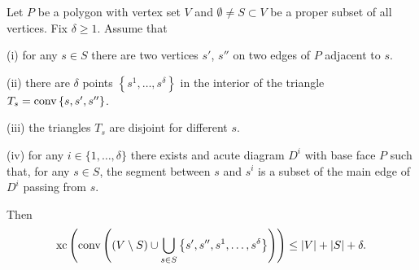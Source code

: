 \begin{theorem}
  Let $P$ be a polygon with vertex set $V$ and $\emptyset \neq S \subset V$ be a proper subset of all vertices. Fix $\delta \geq 1$. Assume that

  (i) for any $s \in S$ there are two vertices $s'$, $s''$ on two edges of $P$ adjacent to $s$.

  (ii) there are $\delta$ points $\left\{s^1, \dots, s^\delta \right\}$ in the interior of the triangle ${T_s = \operatorname{conv} \left\{s,s',s''\right\}}$.
  
  (iii) the triangles $T_s$ are disjoint for different $s$.

  (iv) for any $i \in \{1,\dots,\delta\}$ there exists and acute diagram $D^i$ with base face $P$ such that, for any $s \in S$, the segment between $s$ and $s^i$ is a subset of the main edge of $D^i$ passing from $s$. 
  
  Then $$\operatorname{xc}\left( \operatorname{conv}\left( (V \setminus S) \cup \bigcup_{s \in S} \left\{ s',s'',s^1,\dots,s^\delta \right\}  \right) \right) \leq \lvert V\rvert + \lvert S\rvert + \delta .$$
\end{theorem}




